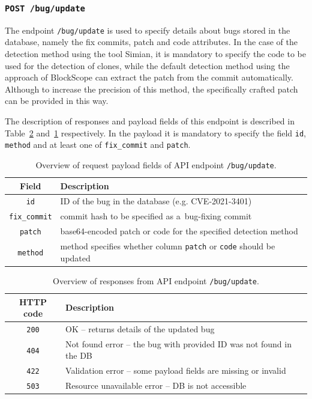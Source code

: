   \subsubsection*{\texttt{POST /bug/update}}
  The endpoint \texttt{/bug/update} is used to specify details about bugs stored in the database, namely the fix
  commits, patch and code attributes. In the case of the detection method using the tool Simian, it is mandatory to specify
  the code to be used for the detection of clones, while the default detection method using the approach of BlockScope
  can extract the patch from the commit automatically. Although to increase the precision of this method, the specifically
  crafted patch can be provided in this way.

  The description of responses and payload fields of this endpoint is described in Table~\ref{tab:bug-update-rs}
  and~\ref{tab:bug-update-rq} respectively. In the payload it is mandatory to specify the field \texttt{id}, \texttt{method}
  and at least one of \texttt{fix\_commit} and \texttt{patch}.

  \begin{table}[h]
        \centering
        \begin{tabular}{|c|l|}
          \hline
            Field & Description \\
          \hline
            \texttt{id} & ID of the bug in the database (e.g. CVE-2021-3401) \\
            \texttt{fix\_commit} & commit hash to be specified as a~bug-fixing commit \\
            \texttt{patch} & base64-encoded patch or code for the specified detection method \\
            \texttt{method} & method specifies whether column \texttt{patch} or \texttt{code} should be updated \\
          \hline
        \end{tabular}
        \caption{Overview of request payload fields of API endpoint \texttt{/bug/update}.}
        \label{tab:bug-update-rq}
    \end{table}

    \begin{table}[h]
        \centering
        \begin{tabular}{|c|l|}
          \hline
            HTTP code & Description \\
          \hline
            \texttt{200} & OK -- returns details of the updated bug \\
            \texttt{404} & Not found error -- the bug with provided ID was not found in the DB \\
            \texttt{422} & Validation error -- some payload fields are missing or invalid \\
            \texttt{503} & Resource unavailable error -- DB is not accessible \\
          \hline
        \end{tabular}
        \caption{Overview of responses from API endpoint \texttt{/bug/update}.}
        \label{tab:bug-update-rs}
    \end{table}

